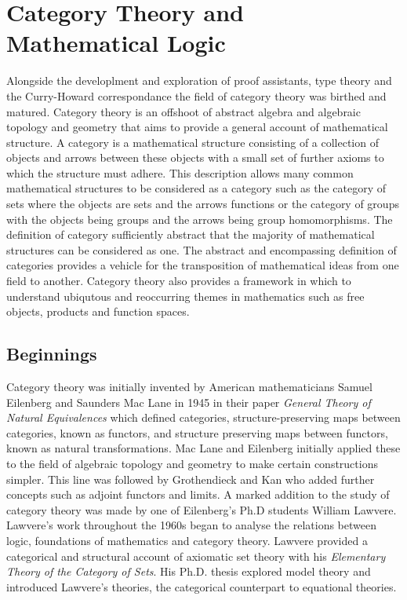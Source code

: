 \section{Category Theory and Mathematical Logic}
Alongside the developlment and exploration of  proof assistants, type theory and
the Curry-Howard correspondance the field of category theory was birthed and
matured. Category theory is an offshoot of abstract algebra and algebraic
topology and geometry that aims to provide a general account of mathematical
structure. A category is a mathematical structure consisting of a collection of
objects and arrows between these objects with a small set of further axioms to
which the structure must adhere. This description allows many common
mathematical structures to be considered as a category such as the category of
sets where the objects are sets and the arrows functions or the category of
groups with the objects being groups and the arrows being group homomorphisms.
The definition of category sufficiently abstract that the majority of
mathematical structures can be considered as one. The abstract and encompassing
definition of categories provides a vehicle for the transposition of
mathematical ideas from one field to another. Category theory also provides a
framework in which to understand ubiqutous and reoccurring themes in mathematics
such as free objects, products and function spaces.
\subsection{Beginnings}
Category theory was initially invented by American mathematicians Samuel
Eilenberg and Saunders Mac Lane in 1945 in their paper \textit{General Theory of
Natural Equivalences} which defined categories, structure-preserving maps
between categories, known as functors, and structure preserving maps between
functors, known as natural transformations. Mac Lane and Eilenberg initially
applied these to the field of algebraic topology and geometry to make certain
constructions simpler.  This line was followed by Grothendieck and Kan who added
further concepts such as adjoint functors and limits. A marked addition to the
study of category theory was made by one of Eilenberg's Ph.D students William
Lawvere. Lawvere's work throughout the 1960s began to analyse the relations
between logic, foundations of mathematics and category theory. Lawvere provided
a categorical and structural account of axiomatic set theory with his
\textit{Elementary Theory of the Category of Sets}. His Ph.D. thesis explored
model theory and introduced Lawvere's theories, the categorical counterpart to
equational theories.

